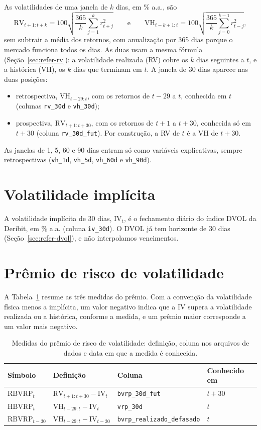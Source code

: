 As volatilidades de uma janela de $k$ dias, em \% a.a., são
\[
\text{RV}_{t+1:t+k} = 100 \sqrt{\frac{365}{k} \sum_{j=1}^{k} r_{t+j}^2}
\qquad \text{e} \qquad
\text{VH}_{t-k+1:t} = 100 \sqrt{\frac{365}{k} \sum_{j=0}^{k-1} r_{t-j}^2},
\]
sem subtrair a média dos retornos, com anualização por 365 dias porque o
mercado funciona todos os dias. As duas usam a mesma fórmula
(Seção~\ref{sec:refer-rv}): a volatilidade realizada (RV) cobre os $k$ dias
seguintes a $t$, e a histórica (VH), os $k$ dias que terminam em $t$. A janela
de 30 dias aparece nas duas posições:
\begin{itemize}
    \item retrospectiva, $\text{VH}_{t-29:t}$, com os retornos de $t-29$ a
          $t$, conhecida em $t$ (colunas \texttt{rv\_30d} e \texttt{vh\_30d});
    \item prospectiva, $\text{RV}_{t+1:t+30}$, com os retornos de $t+1$ a
          $t+30$, conhecida só em $t+30$ (coluna \texttt{rv\_30d\_fut}). Por
          construção, a RV de $t$ é a VH de $t+30$.
\end{itemize}
As janelas de 1, 5, 60 e 90 dias entram só como variáveis explicativas,
sempre retrospectivas (\texttt{vh\_1d}, \texttt{vh\_5d}, \texttt{vh\_60d} e \texttt{vh\_90d}).

\section{Volatilidade implícita}

A volatilidade implícita de 30 dias, $\text{IV}_t$, é o fechamento diário do
índice DVOL da Deribit, em \% a.a. (coluna \texttt{iv\_30d}). O DVOL já tem
horizonte de 30 dias (Seção~\ref{sec:refer-dvol}), e não
interpolamos vencimentos.

\section{Prêmio de risco de volatilidade}

A Tabela~\ref{tab:var-premio} resume as três medidas do prêmio. Com a
convenção da volatilidade física menos a implícita, um valor negativo indica
que a IV supera a volatilidade realizada ou a histórica, conforme a medida, e um prêmio maior corresponde a um valor mais
negativo.

\begin{table}[H]
\centering
\caption{Medidas do prêmio de risco de volatilidade: definição, coluna nos
arquivos de dados e data em que a medida é conhecida.}
\label{tab:var-premio}
\small
\begin{tabular}{llll}
\toprule
Símbolo & Definição & Coluna & Conhecido em \\
\midrule
$\text{RBVRP}_t$ & $\text{RV}_{t+1:t+30} - \text{IV}_t$ & \texttt{bvrp\_30d\_fut} & $t+30$ \\
$\text{HBVRP}_t$ & $\text{VH}_{t-29:t} - \text{IV}_t$ & \texttt{vrp\_30d} & $t$ \\
$\text{RBVRP}_{t-30}$ & $\text{VH}_{t-29:t} - \text{IV}_{t-30}$ & \texttt{bvrp\_realizado\_defasado} & $t$ \\
\bottomrule
\end{tabular}
\end{table}

